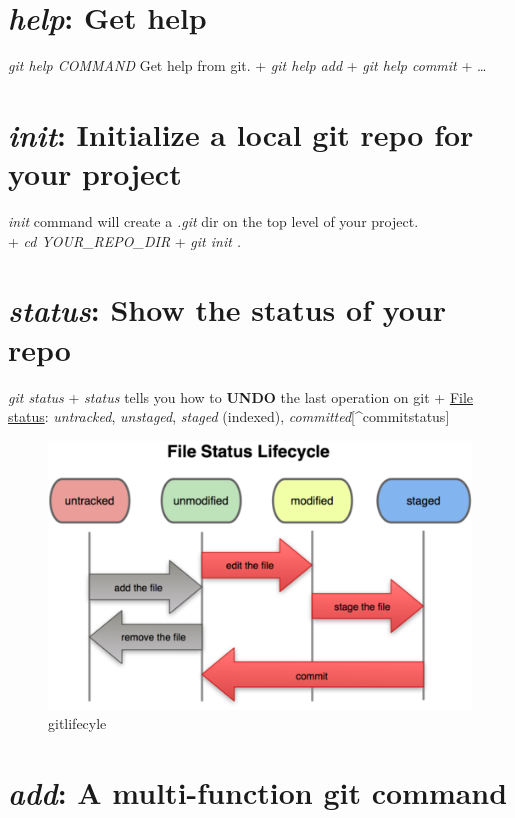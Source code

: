 \documentclass[]{article}
\makeatletter
\def\maxwidth{\ifdim\Gin@nat@width>\linewidth\linewidth
\else\Gin@nat@width\fi}
\let\Oldincludegraphics\includegraphics
\renewcommand{\includegraphics}[1]{\Oldincludegraphics[width=\maxwidth]{#1}}
\makeatother
\begin{document}
\section{\emph{help}: Get help}

\emph{git help COMMAND} Get help from git. + \emph{git help add} +
\emph{git help commit} + \ldots{}

\section{\emph{init}: Initialize a local git repo for your project}

\emph{init} command will create a \emph{.git} dir on the top level of
your project.\\ + \emph{cd YOUR\_REPO\_DIR} + \emph{git init .}

\section{\emph{status}: Show the status of your repo}

\emph{git status} + \emph{status} tells you how to \textbf{UNDO} the
last operation on git +
\href{http://progit.org/book/ch2-2.html\%20{[}\^{}commitstatus{]}:\%20The\%20*committed*\%20status\%20simply\%20displays\%20nothing\%20when\%20running\%20*git\%20status*.}{File
status}: \emph{untracked}, \emph{unstaged}, \emph{staged} (indexed),
\emph{committed}{[}\^{}commitstatus{]}

\begin{figure}[htbp]
\centering
\includegraphics{figures/gitlifecycle.png}
\caption{gitlifecyle}
\end{figure}

\section{\emph{add}: A multi-function git command}
\end{document}
